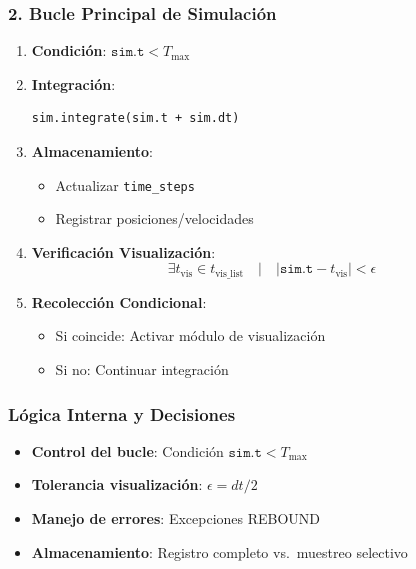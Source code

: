 \subsubsection*{2. Bucle Principal de Simulación}
\begin{enumerate}[label=\textbf{Paso \arabic*:}]
    \item \textbf{Condición}: $\texttt{sim.t} < T_{\text{max}}$
    \item \textbf{Integración}:
    \begin{verbatim}
sim.integrate(sim.t + sim.dt)
    \end{verbatim}
    \item \textbf{Almacenamiento}:
    \begin{itemize}
        \item Actualizar \texttt{time\_steps}
        \item Registrar posiciones/velocidades
    \end{itemize}
    \item \textbf{Verificación Visualización}:
    \begin{equation*}
        \exists t_{\text{vis}} \in t_{\text{vis\_list}} \quad | \quad |\texttt{sim.t} - t_{\text{vis}}| < \epsilon
    \end{equation*}
    \item \textbf{Recolección Condicional}:
    \begin{itemize}
        \item Si coincide: Activar módulo de visualización
        \item Si no: Continuar integración
    \end{itemize}
\end{enumerate}

\subsubsection{Lógica Interna y Decisiones}
\begin{itemize}
    \item \textbf{Control del bucle}: Condición $\texttt{sim.t} < T_{\text{max}}$
    \item \textbf{Tolerancia visualización}: $\epsilon = dt/2$
    \item \textbf{Manejo de errores}: Excepciones REBOUND
    \item \textbf{Almacenamiento}: Registro completo vs.\ muestreo selectivo
\end{itemize}

